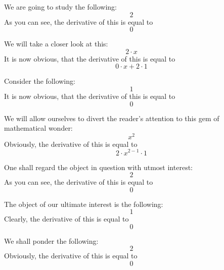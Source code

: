 \documentclass{article}
\begin{document}
We are going to study the following:
\begin{equation}
2 
\end{equation}
As you can see, the derivative of this is equal to
\begin{equation}
0 
\end{equation}

We will take a closer look at this:
\begin{equation}
2 \cdot x 
\end{equation}
It is now obvious, that the derivative of this is equal to
\begin{equation}
0 \cdot x + 2 \cdot 1 
\end{equation}

Consider the following:
\begin{equation}
1 
\end{equation}
It is now obvious, that the derivative of this is equal to
\begin{equation}
0 
\end{equation}

We will allow ourselves to divert the reader's attention to this gem of mathematical wonder:
\begin{equation}
x ^{2 } 
\end{equation}
Obviously, the derivative of this is equal to
\begin{equation}
2 \cdot x ^{2 - 1 } \cdot 1 
\end{equation}

One shall regard the object in question with utmost interest:
\begin{equation}
2 
\end{equation}
As you can see, the derivative of this is equal to
\begin{equation}
0 
\end{equation}

The object of our ultimate interest is the following:
\begin{equation}
1 
\end{equation}
Clearly, the derivative of this is equal to
\begin{equation}
0 
\end{equation}

We shall ponder the following:
\begin{equation}
2 
\end{equation}
Obviously, the derivative of this is equal to
\begin{equation}
0 
\end{equation}
\end{document}
